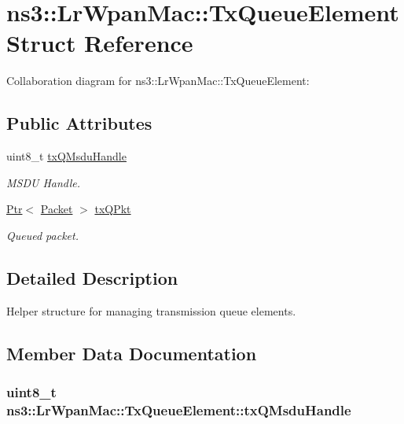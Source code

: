 \hypertarget{structns3_1_1LrWpanMac_1_1TxQueueElement}{}\section{ns3\+:\+:Lr\+Wpan\+Mac\+:\+:Tx\+Queue\+Element Struct Reference}
\label{structns3_1_1LrWpanMac_1_1TxQueueElement}


Collaboration diagram for ns3\+:\+:Lr\+Wpan\+Mac\+:\+:Tx\+Queue\+Element\+:
\subsection*{Public Attributes}
\begin{DoxyCompactItemize}
\item 
uint8\+\_\+t \hyperlink{structns3_1_1LrWpanMac_1_1TxQueueElement_a5ffbf150283f4338032ccbb11fd187d8}{tx\+Q\+Msdu\+Handle}
\begin{DoxyCompactList}\small\item\em M\+S\+DU Handle. \end{DoxyCompactList}\item 
\hyperlink{classns3_1_1Ptr}{Ptr}$<$ \hyperlink{classns3_1_1Packet}{Packet} $>$ \hyperlink{structns3_1_1LrWpanMac_1_1TxQueueElement_a4af6aca9185414236f8cad149fb3fc06}{tx\+Q\+Pkt}
\begin{DoxyCompactList}\small\item\em Queued packet. \end{DoxyCompactList}\end{DoxyCompactItemize}


\subsection{Detailed Description}
Helper structure for managing transmission queue elements. 

\subsection{Member Data Documentation}
\subsubsection[{\texorpdfstring{tx\+Q\+Msdu\+Handle}{txQMsduHandle}}]{\setlength{\rightskip}{0pt plus 5cm}uint8\+\_\+t ns3\+::\+Lr\+Wpan\+Mac\+::\+Tx\+Queue\+Element\+::tx\+Q\+Msdu\+Handle}\hypertarget{structns3_1_1LrWpanMac_1_1TxQueueElement_a5ffbf150283f4338032ccbb11fd187d8}{}\label{structns3_1_1LrWpanMac_1_1TxQueueElement_a5ffbf150283f4338032ccbb11fd187d8}


